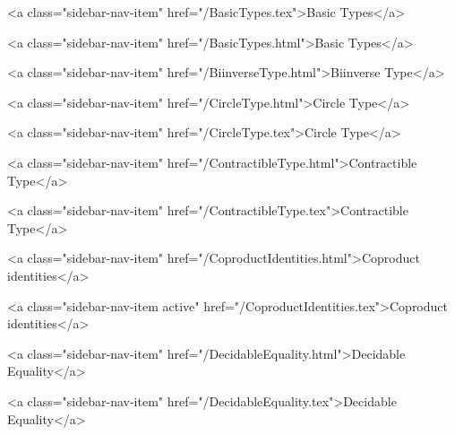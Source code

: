           <a class="sidebar-nav-item" href="/BasicTypes.tex">Basic Types</a>
        
      
    
      
        
          <a class="sidebar-nav-item" href="/BasicTypes.html">Basic Types</a>
        
      
    
      
        
          <a class="sidebar-nav-item" href="/BiinverseType.html">Biinverse Type</a>
        
      
    
      
        
          <a class="sidebar-nav-item" href="/CircleType.html">Circle Type</a>
        
      
    
      
        
          <a class="sidebar-nav-item" href="/CircleType.tex">Circle Type</a>
        
      
    
      
        
          <a class="sidebar-nav-item" href="/ContractibleType.html">Contractible Type</a>
        
      
    
      
        
          <a class="sidebar-nav-item" href="/ContractibleType.tex">Contractible Type</a>
        
      
    
      
        
          <a class="sidebar-nav-item" href="/CoproductIdentities.html">Coproduct identities</a>
        
      
    
      
        
          <a class="sidebar-nav-item active" href="/CoproductIdentities.tex">Coproduct identities</a>
        
      
    
      
        
          <a class="sidebar-nav-item" href="/DecidableEquality.html">Decidable Equality</a>
        
      
    
      
        
          <a class="sidebar-nav-item" href="/DecidableEquality.tex">Decidable Equality</a>
        
      
    
